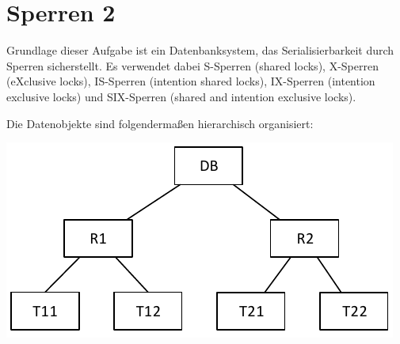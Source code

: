 \section{Sperren 2}

Grundlage dieser Aufgabe ist ein Datenbanksystem, das Serialisierbarkeit durch Sperren sicherstellt. Es verwendet dabei S-Sperren (shared locks), X-Sperren (eXclusive locks), IS-Sperren (intention shared locks), IX-Sperren (intention exclusive locks) und SIX-Sperren (shared and intention exclusive locks).

Die Datenobjekte sind folgendermaßen hierarchisch organisiert:

\begin{center}
	\colorbox{white}{\includegraphics{Pictures/UeIDB14_Sperrhierarchie.pdf}}
\end{center}
